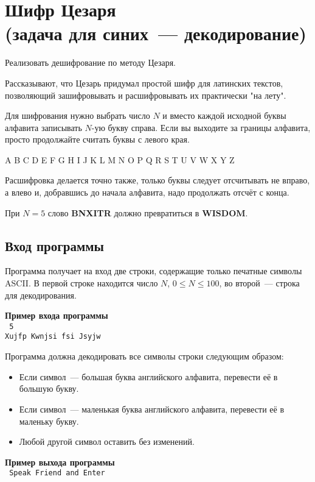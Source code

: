\documentclass[a4paper,10pt]{article}
\begin{document}
\section*{Шифр Цезаря\\
(задача для синих~--- декодирование)}

Реализовать дешифрование по методу Цезаря.

Рассказывают, что Цезарь придумал простой шифр для латинских текстов, позволяющий зашифровывать и расшифровывать их практически "на лету".

Для шифрования нужно выбрать число $N$ и вместо каждой исходной буквы алфавита записывать $N$-ую букву справа.
Если вы выходите за границы алфавита, просто продолжайте считать буквы с левого края.

\begin{center}
A B C D E F G H I J K L M N O P Q R S T U V W X Y Z
\end{center}

Расшифровка делается точно также, только буквы следует отсчитывать не вправо, а влево и, добравшись до начала алфавита, надо продолжать отсчёт с конца.

При $N = 5$ слово \textbf{BNXITR} должно превратиться в \textbf{WISDOM}.

\subsection*{Вход программы}

Программа получает на вход две строки, содержащие только печатные символы ASCII.
В первой строке находится число $N$, $0 \leq N \leq 100$, во второй~--- строка для декодирования.

\noindent\textbf{Пример входа программы}\\
\texttt{
5\\
Xujfp Kwnjsi fsi Jsyjw
}

Программа должна декодировать все символы строки следующим образом:

\begin{itemize}
    \item Если символ~--- большая буква английского алфавита, перевести её в большую букву.
    \item Если символ~--- маленькая буква английского алфавита, перевести её в маленьку букву.
    \item Любой другой символ оставить без изменений.
\end{itemize}

\noindent\textbf{Пример выхода программы}\\
\texttt{
Speak Friend and Enter
}
\end{document}
